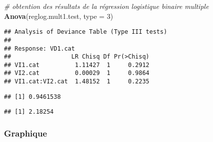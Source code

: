 \documentclass[
]{book}
\newenvironment{Shaded}{\begin{snugshade}}{\end{snugshade}}
\newcommand{\CommentTok}[1]{\textcolor[rgb]{0.56,0.35,0.01}{\textit{#1}}}
\newcommand{\DataTypeTok}[1]{\textcolor[rgb]{0.13,0.29,0.53}{#1}}
\newcommand{\DecValTok}[1]{\textcolor[rgb]{0.00,0.00,0.81}{#1}}
\newcommand{\KeywordTok}[1]{\textcolor[rgb]{0.13,0.29,0.53}{\textbf{#1}}}
\newcommand{\NormalTok}[1]{#1}
\newcommand{\OperatorTok}[1]{\textcolor[rgb]{0.81,0.36,0.00}{\textbf{#1}}}
\begin{document}
\begin{Shaded}
\begin{Highlighting}[]
\CommentTok{# obtention des résultats de la régression logistique binaire multiple }
\KeywordTok{Anova}\NormalTok{(reglog.mult1.test, }\DataTypeTok{type =} \DecValTok{3}\NormalTok{)}
\end{Highlighting}
\end{Shaded}

\begin{verbatim}
## Analysis of Deviance Table (Type III tests)
## 
## Response: VD1.cat
##                 LR Chisq Df Pr(>Chisq)
## VI1.cat          1.11427  1     0.2912
## VI2.cat          0.00029  1     0.9864
## VI1.cat:VI2.cat  1.48152  1     0.2235
\end{verbatim}

\begin{Shaded}
\end{Shaded}

\begin{verbatim}
## [1] 0.9461538
\end{verbatim}

\begin{Shaded}
\end{Shaded}

\begin{verbatim}
## [1] 2.18254
\end{verbatim}

\hypertarget{graphique-9}{%
\subsubsection{Graphique}\label{graphique-9}}
\end{document}
